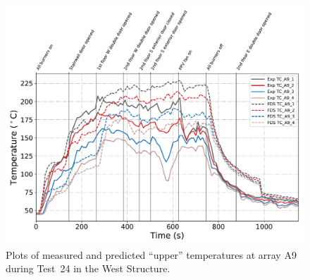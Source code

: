 \begin{figure}[!h]
	\centering
	\includegraphics[width=\columnwidth]{Figures/Plots/Validation/Temperature/Test_24_TC_A9_upper}
	\caption{Plots of measured and predicted ``upper'' temperatures at array A9 during Test~24 in the West Structure.}
	\label{fig:TCA9_upper_data_Test24}
\end{figure}

